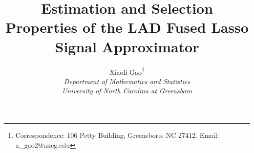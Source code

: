 \documentclass[12pt]{article}
\begin{document}
\title{\bf Estimation and Selection Properties of the LAD Fused Lasso
Signal Approximator}
\date{}

\author{\begin{tabular}{c} Xiaoli Gao\footnote{Correspondence: 106 Petty Building, Greensboro, NC 27412. Email: x\_gao2@uncg.edu}\\
\emph{Department of Mathematics and Statistics}\\
\emph{University of North Carolina at Greensboro}
\end{tabular}}
\titlepage

\maketitle
\end{document}
